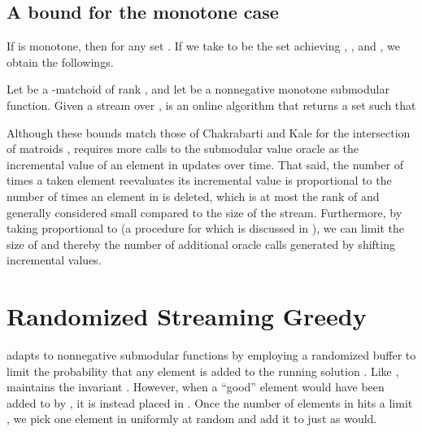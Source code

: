 \documentclass[oneside,letterpaper]{scrartcl} \usepackage{macros}
\begin{document}
\subsection{A bound for the monotone case}
 If  is monotone, then  for any set
. If we take  to be the set  achieving , , and , we obtain the followings.
\begin{corollary}Let  be a -matchoid of rank , and let  be a nonnegative monotone
  submodular function. Given a stream over ,
   is an online algorithm that
  returns a set  such that
  
\end{corollary}
\begin{remark}
  Although these bounds match those of Chakrabarti and Kale for the
  intersection of  matroids \cite{ck-smms-14},
   requires more calls to the submodular
  value oracle as the incremental value of an element in  updates
  over time. That said, the number of times a taken element 
  reevaluates its incremental value is proportional to the number of
  times an element in  is deleted, which is at most the
  rank of  and generally considered small compared to the
  size of the stream.  Furthermore, by taking  proportional to
   (a procedure for which is discussed in
  ), we can limit the size of  and
  thereby the number of additional oracle calls generated by shifting
  incremental values.
\end{remark}



\section{Randomized Streaming Greedy}

\newcommand{\buffer}{B}\newcommand{\bufferlimit}{K}\newcommand{\instance}{G}\newcommand{\finalbuffer}{\tilde{B}}\newcommand{\bestset}{\hat{S}}

 adapts
 to nonnegative submodular functions by
employing a randomized buffer  to limit the probability that
any element is added to the running solution .  Like
, 
maintains the invariant . However, when a
``good'' element would have been added to  by
, it is instead placed in . Once
the number of elements in  hits a limit , we pick one
element in  uniformly at random and add it to  just as
 would.
\end{document}
